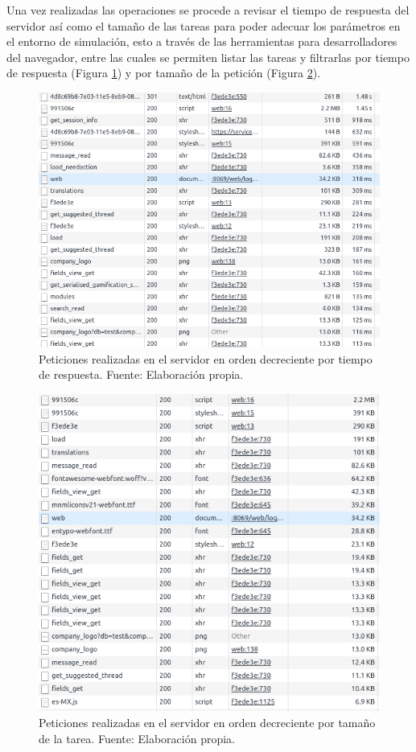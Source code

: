 Una vez realizadas las operaciones se procede a revisar el tiempo de respuesta del servidor así como el tamaño de las tareas para poder adecuar los parámetros en el entorno de simulación, esto a través de las herramientas para desarrolladores del navegador, entre las cuales se permiten listar las tareas y filtrarlas por tiempo de respuesta (Figura \ref{fig:RequestOdooByTime}) y por tamaño de la petición (Figura \ref{fig:RequestOdooBySize}).

\renewcommand\thefigure{\arabic{figure}}
\begin{figure}[h!]
	\centering
	\includegraphics[scale=0.4]{media/odoo/5}
	\caption{Peticiones realizadas en el servidor en orden decreciente por tiempo de respuesta. Fuente: Elaboración propia.}
	\label{fig:RequestOdooByTime}
\end{figure}

\renewcommand\thefigure{\arabic{figure}}
\begin{figure}[h!]
	\centering
	\includegraphics[scale=0.5]{media/odoo/6}
	\caption{Peticiones realizadas en el servidor en orden decreciente por tamaño de la tarea. Fuente: Elaboración propia.}
	\label{fig:RequestOdooBySize}
\end{figure}

